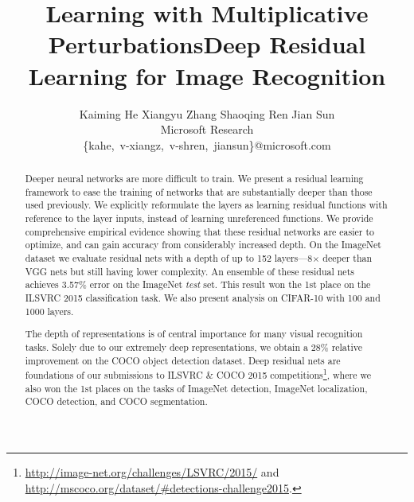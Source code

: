 \documentclass{article}
\title{Learning with Multiplicative Perturbations}
\begin{document}
\title{Deep Residual Learning for Image Recognition}



\author{Kaiming He \qquad Xiangyu Zhang \qquad Shaoqing Ren \qquad Jian Sun \\
\large Microsoft Research \vspace{-.2em}\\
\normalsize
\{kahe,~v-xiangz,~v-shren,~jiansun\}@microsoft.com
}

\maketitle

\begin{abstract}
\vspace{-.5em}
Deeper neural networks are more difficult to train. We present a residual learning framework to ease the training of networks that are substantially deeper than those used previously. We explicitly reformulate the layers as learning residual functions with reference to the layer inputs, instead of learning unreferenced functions. We provide comprehensive empirical evidence showing that these residual networks are easier to optimize, and can gain accuracy from considerably increased depth.
On the ImageNet dataset we evaluate residual nets with a depth of up to 152 layers---8$\times$ deeper than VGG nets \cite{Simonyan2015} but still having lower complexity.
An ensemble of these residual nets achieves 3.57\% error on the ImageNet \emph{test} set. This result won the 1st place on the ILSVRC 2015 classification task.
We also present analysis on CIFAR-10 with 100 and 1000 layers.

The depth of representations is of central importance for many visual recognition tasks. Solely due to our extremely deep representations, we obtain a 28\% relative improvement on the COCO object detection dataset. Deep residual nets are foundations of our submissions to ILSVRC \& COCO 2015 competitions\footnote{\fontsize{7.6pt}{1em}\selectfont \url{http://image-net.org/challenges/LSVRC/2015/} and \url{http://mscoco.org/dataset/\#detections-challenge2015}.}, where we also won the 1st places on the tasks of ImageNet detection, ImageNet localization, COCO detection, and COCO segmentation.
\end{abstract}

\end{document}
